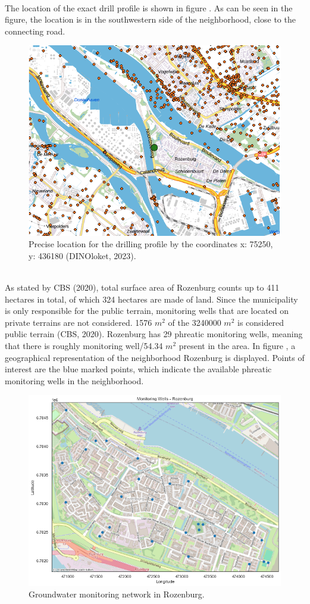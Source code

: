 \\
The location of the exact drill profile is shown in figure . As can be seen in the figure, the location is in the southwestern side of the neighborhood, close to the connecting road. 
\\
\begin{figure}[htbp]
    \centering
    \includegraphics[width=0.60\linewidth]{figures/roz/drillsite.png}
    \caption{Precise location for the drilling profile by the coordinates x: 75250, y: 436180 (DINOloket, 2023).}
    \label{drillroz}
\end{figure}
\\
As stated by CBS (2020),  total surface area of Rozenburg counts up to 411 hectares in total, of which 324 hectares are made of land. Since the municipality is only responsible for the public terrain, monitoring wells that are located on private terrains are not considered. 1576 $m^2$ of the 3240000 $m^2$ is considered public terrain (CBS, 2020). Rozenburg has 29 phreatic monitoring wells, meaning that there is roughly monitoring well/54.34 $m^2$ present in the area. In figure , a geographical representation of the neighborhood Rozenburg is displayed. Points of interest are the blue marked points, which indicate the available phreatic monitoring wells in the neighborhood.

\begin{figure}[htbp]
    \centering
    \includegraphics[width=0.70\linewidth]{frontmatter/Rozenburg-fig/Before.png}
    \caption{Groundwater monitoring network in Rozenburg.}\label{beforeroz}
\end{figure}




